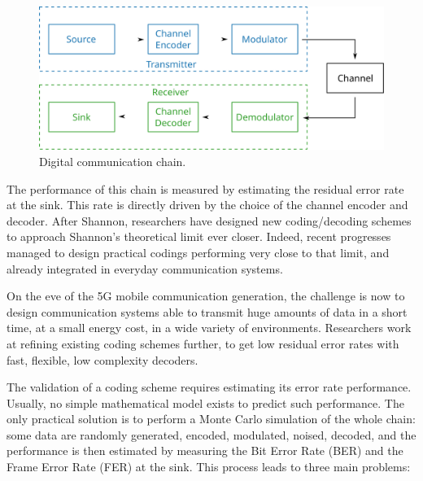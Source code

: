 \begin{figure}[htp]
  \centering
  \includegraphics[width=0.70\linewidth]{intro/com_chain}
  \caption{Digital communication chain.}
  \label{fig:intro_com_chain}
\end{figure}

The performance of this chain is measured by estimating the residual error rate
at the sink. This rate is directly driven by the choice of the channel encoder
and decoder. After Shannon, researchers have designed new coding/decoding
schemes to approach Shannon's theoretical limit ever closer. Indeed, recent
progresses managed to design practical codings performing very close to that
limit, and already integrated in everyday communication systems.

On the eve of the 5G mobile communication generation, the challenge is now to
design communication systems able to transmit huge amounts of data in a short
time, at a small energy cost, in a wide variety of environments. Researchers
work at refining existing coding schemes further, to get low residual error
rates with fast, flexible, low complexity decoders.

The validation of a coding scheme requires estimating its error rate
performance. Usually, no simple mathematical model exists to predict such
performance. The only practical solution is to perform a Monte Carlo simulation
of the whole chain: some data are randomly generated, encoded, modulated,
noised, decoded, and the performance is then estimated by measuring the Bit
Error Rate (BER) and the Frame Error Rate (FER) at the sink. This process leads
to three main problems:

